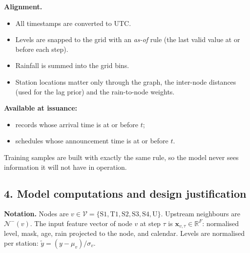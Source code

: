 \documentclass[11pt]{article}
\begin{document}
\noindent\textbf{Alignment.}
\begin{itemize}
  \item All timestamps are converted to UTC.
  \item Levels are snapped to the grid with an \emph{as-of} rule (the last valid value at or before each step).
  \item Rainfall is summed into the grid bins.
  \item Station locations matter only through the graph, the inter-node distances (used for the lag prior) and the rain-to-node weights.
\end{itemize}

\noindent\textbf{Available at issuance:}
\begin{itemize}
  \item records whose arrival time is at or before $t$;
  \item schedules whose announcement time is at or before $t$.
\end{itemize}
Training samples are built with exactly the same rule, so the model never sees information it will not have in operation.

\subsection*{4. Model computations and design justification}

\textbf{Notation.} Nodes are $v\in\mathcal{V}=\{\text{S1},\text{T1},\text{S2},\text{S3},\text{S4},\text{U}\}$. Upstream neighbours are $\mathcal{N}^-(v)$. The input feature vector of node $v$ at step $\tau$ is $\mathbf{x}_{v,\tau}\in\mathbb{R}^F$: normalised level, mask, age, rain projected to the node, and calendar. Levels are normalised per station: $\tilde y=(y-\mu_v)/\sigma_v$.
\end{document}

